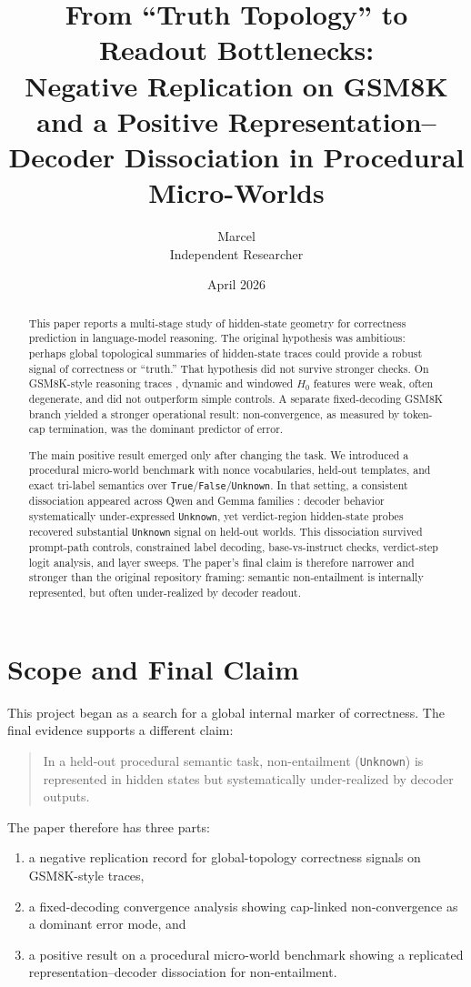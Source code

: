 \documentclass[11pt]{article}
\title{From ``Truth Topology'' to Readout Bottlenecks:\\
Negative Replication on GSM8K and a Positive Representation--Decoder Dissociation in Procedural Micro-Worlds}
\author{Marcel \\ Independent Researcher}
\date{April 2026}
\begin{document}
\maketitle
\onehalfspacing

\begin{abstract}
This paper reports a multi-stage study of hidden-state geometry for correctness prediction in language-model reasoning.
The original hypothesis was ambitious: perhaps global topological summaries of hidden-state traces could provide a robust signal of correctness or ``truth.''
That hypothesis did not survive stronger checks.
On GSM8K-style reasoning traces \cite{cobbe2021gsm8k}, dynamic and windowed $H_0$ features were weak, often degenerate, and did not outperform simple controls.
A separate fixed-decoding GSM8K branch yielded a stronger operational result: non-convergence, as measured by token-cap termination, was the dominant predictor of error.

The main positive result emerged only after changing the task.
We introduced a procedural micro-world benchmark with nonce vocabularies, held-out templates, and exact tri-label semantics over \texttt{True}/\texttt{False}/\texttt{Unknown}.
In that setting, a consistent dissociation appeared across Qwen and Gemma families \cite{qwen_model_card,gemma_model_card}: decoder behavior systematically under-expressed \texttt{Unknown}, yet verdict-region hidden-state probes recovered substantial \texttt{Unknown} signal on held-out worlds.
This dissociation survived prompt-path controls, constrained label decoding, base-vs-instruct checks, verdict-step logit analysis, and layer sweeps.
The paper's final claim is therefore narrower and stronger than the original repository framing: semantic non-entailment is internally represented, but often under-realized by decoder readout.
\end{abstract}

\section{Scope and Final Claim}
This project began as a search for a global internal marker of correctness.
The final evidence supports a different claim:
\begin{quote}
In a held-out procedural semantic task, non-entailment (\texttt{Unknown}) is represented in hidden states but systematically under-realized by decoder outputs.
\end{quote}

The paper therefore has three parts:
\begin{enumerate}
  \item a negative replication record for global-topology correctness signals on GSM8K-style traces,
  \item a fixed-decoding convergence analysis showing cap-linked non-convergence as a dominant error mode, and
  \item a positive result on a procedural micro-world benchmark showing a replicated representation--decoder dissociation for non-entailment.
\end{enumerate}
\end{document}
